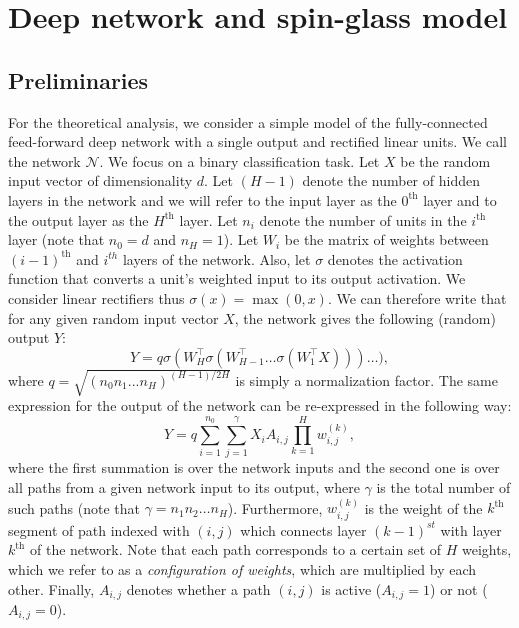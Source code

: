 \documentclass[twoside]{article}
\begin{document}
\section{Deep network and spin-glass model}
\label{sec:NNSG}

\subsection{Preliminaries}

For the theoretical analysis, we consider a simple model of the fully-connected feed-forward deep network with a single output and rectified linear units. We call the network $\mathcal{N}$. We focus on a binary classification task. Let $X$ be the random input vector of dimensionality $d$. Let $(H-1)$ denote the number of hidden layers in the network and we will refer to the input layer as the $0^{\text{th}}$ layer and to the output layer as the $H^{\text{th}}$ layer. Let $n_i$ denote the number of units in the $i^{\text{th}}$ layer (note that $n_0 = d$ and $n_H = 1$). Let $W_i$ be the matrix of weights between $(i - 1)^{\text{th}}$ and $i^{th}$ layers of the network. Also, let $\sigma$ denotes the activation function that converts a unit's weighted input to its output activation. We consider linear rectifiers thus $\sigma(x) = \max(0,x)$. We can therefore write that for any given random input vector $X$, the network gives the following (random) output $Y$:
\[Y = q\sigma(W_H^{\top}\sigma(W_{H-1}^{\top}\dots\sigma(W_1^{\top}X)))\dots),
\]
where $q = \sqrt{(n_0n_1...n_H)^{(H-1)/2H}}$ is simply a normalization factor. The same expression for the output of the network can be re-expressed in the following way:
\begin{equation}
Y = q\sum_{i=1}^{n_0}\sum_{j = 1}^\gamma X_{i}A_{i,j}\prod_{k = 1}^{H}w_{i,j}^{(k)},
\label{eq:befrein}
\end{equation}
where the first summation is over the network inputs and the second one is over all paths from a given network input to its output, where $\gamma$ is the total number of such paths (note that $\gamma = n_1n_2\dots n_H$). Furthermore, $w_{i,j}^{(k)}$ is the weight of the $k^{\text{th}}$ segment of path indexed with $(i,j)$ which connects layer $(k-1)^{st}$ with layer $k^{\text{th}}$ of the network. Note that each path corresponds to a certain set of $H$ weights, which we refer to as a \textit{configuration of weights}, which are multiplied by each other. Finally, $A_{i,j}$ denotes whether a path $(i,j)$ is active ($A_{i,j} = 1$) or not ($A_{i,j} = 0$). 
\end{document}
